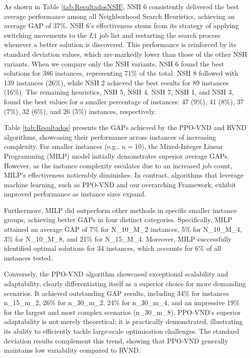 \documentclass{article}
\begin{document}
As shown in Table \ref{tab:ResultadosNSH}, NSH 6 consistently delivered the best average performance among all Neighborhood Search Heuristics, achieving an average GAP of 37\%. NSH 6's effectiveness stems from its strategy of applying switching movements to the $L1$ job list and restarting the search process whenever a better solution is discovered. This performance is reinforced by its standard deviation values, which are markedly lower than those of the other NSH variants. When we compare only the NSH variants, NSH 6 found the best solutions for 386 instances, representing 71\% of the total. NSH 8 followed with 139 instances (26\%), while NSH 2 achieved the best results for 89 instances (16\%). The remaining heuristics, NSH 5, NSH 4, NSH 7, NSH 1, and NSH 3, found the best values for a smaller percentage of instances: 47 (9\%), 41 (8\%), 37 (7\%), 32 (6\%), and 26 (5\%) instances, respectively.

Table \ref{tab:Resultados} presents the GAPs achieved by the PPO-VND and RVND algorithms, showcasing their performance across instances of increasing complexity. For smaller instances (e.g., $n=10$), the Mixed-Integer Linear Programming (MILP) model initially demonstrates superior average GAPs. However, as the instance complexity escalates due to an increased job count, MILP's effectiveness noticeably diminishes. In contrast, algorithms that leverage machine learning, such as PPO-VND and our overarching Framework, exhibit improved performance as instance sizes expand.

Furthermore, MILP did outperform other methods in specific smaller instance groups, achieving better GAPs in four distinct categories. Specifically, MILP attained an average GAP of 7\% for N\_10\_M\_2 instances, 5\% for N\_10\_M\_4, 3\% for N\_10\_M\_8, and 21\% for N\_15\_M\_4. Moreover, MILP successfully identified optimal solutions for 34 instances, which accounts for 6\% of all instances tested.


Conversely, the PPO-VND algorithm showcased exceptional scalability and adaptability, clearly differentiating itself as a superior choice for more demanding scenarios. It achieved outstanding GAP results, including 34\% for instances n\_15\_m\_2, 26\% for n\_30\_m\_2, 24\% for n\_30\_m\_4, and an impressive 19\% for the largest and most complex scenarios (n\_30\_m\_8). PPO-VND’s superior adaptability is not merely theoretical; it is practically demonstrated, illustrating its ability to efficiently tackle large-scale optimisation challenges. The standard deviation results complement this trend, showing that PPO-VND generally maintains low variability compared to RVND.
\end{document}

